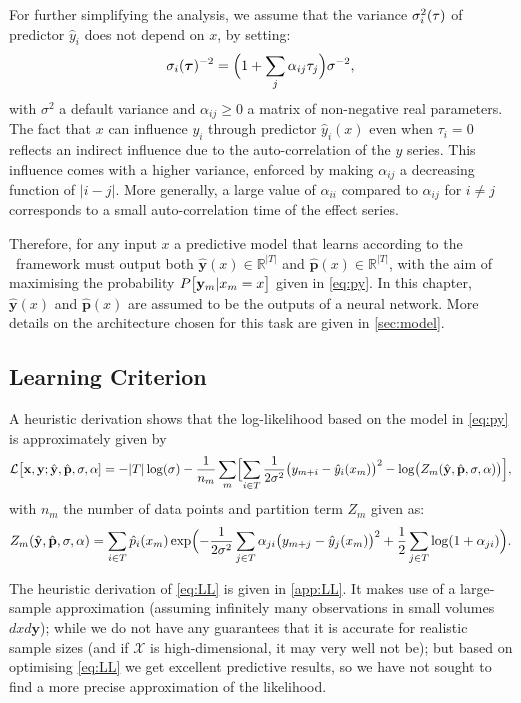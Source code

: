 For further simplifying the analysis, we assume that the variance $\sigma_i^2({\bf \tau})$ of 
predictor $\hat y_i$ does not depend on $x$, by setting:
\[
\sigma_i(\boldsymbol{\tau})^{-2} = \Bigl(1+\sum_j\alpha_{ij} \tau_j\Bigr)\sigma^{-2},
\]
with $\sigma^2$ a default variance and $\alpha_{ij}\ge 0$ a matrix of non-negative real parameters. 
The fact that $x$ can influence $y_i$ through predictor $\hat y_i(x)$ even when $\tau_i=0$ reflects 
an indirect influence due to the auto-correlation of the $y$ series. This influence comes with a 
higher variance, enforced by making $\alpha_{ij}$ a decreasing function of $\vert i-j\vert$. More 
generally, a large value of $\alpha_{ii}$ compared to $\alpha_{ij}$ for $i\ne j$ corresponds to a 
small auto-correlation time of the effect series. 

Therefore, for any input $x$ a predictive model that learns according to the \XX \ framework must 
output both $\hat{\mathbf{y}}(x) \in \mathbb{R}^{\rvert T \rvert}$ and 
$\hat{\mathbf{p}}(x) \in \mathbb{R}^{\rvert T \rvert}$, with the aim of maximising the probability 
$P\bigl[{\bf y}_{m}\vert x_m=x\bigr]$ given in \cref{eq:py}. In this chapter, 
$\hat{\mathbf{y}}(x)$ and $\hat{\mathbf{p}}(x)$ are assumed to be the outputs of a neural network.
More details on the architecture chosen for this task are given in \cref{sec:model}.

\subsection{Learning Criterion}

A heuristic derivation shows that the log-likelihood based on the model in \cref{eq:py} is 
approximately given by
%
\begin{equation}\label{eq:LL}
  {\cal L}\bigl[ {\bf x, y};\hat {\bf y},\hat {\bf p},\sigma,{\bf \alpha}] = 
  -\vert T\vert\log(\sigma)-\frac{1}{n_m}\sum_m\Bigl[
    \sum_{i \in T}\frac{1}{2\sigma^2}\bigl(y_{m+i}-\hat y_i(x_m)\bigr)^2 - 
    \log\bigl(Z_m(\hat {\bf y},\hat {\bf p},\sigma,{\bf \alpha})\bigr)\Bigr],
\end{equation}
%
with $n_m$ the number of data points and partition term $Z_m$ given as:
\[
  Z_m(\hat {\bf y},\hat {\bf p},\sigma,{\bf \alpha}) = \sum_{i \in T}\hat p_i(x_m)\exp\Bigl(
    - \frac{1}{2\sigma^2}\sum_{j\in T}\alpha_{ji}\bigl(y_{m+j}-\hat y_j(x_m)\bigr)^2 
    + \frac{1}{2}\sum_{j\in T}\log(1+\alpha_{ji})\Bigr).
\]

The heuristic derivation of \cref{eq:LL} is given in \cref{app:LL}. It makes use of a large-sample 
approximation (assuming infinitely many observations in small volumes $dx d\mathbf{y}$); while we 
do not have any guarantees that it is accurate for realistic sample sizes (and if $\mathcal{X}$ is 
high-dimensional, it may very well not be); but based on optimising \cref{eq:LL} we get 
excellent predictive results, so we have not sought to find a more precise approximation of 
the likelihood.

